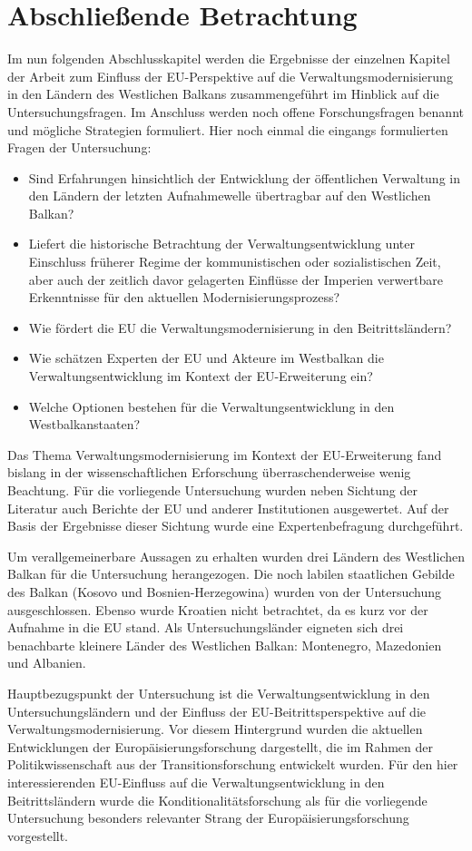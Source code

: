 \chapter{Abschließende Betrachtung}
Im nun folgenden Abschlusskapitel werden die Ergebnisse der einzelnen Kapitel der Arbeit zum Einfluss der EU-Perspektive auf die Verwaltungsmodernisierung in den Ländern des Westlichen Balkans zusammengeführt im Hinblick auf die Untersuchungsfragen. Im Anschluss werden noch offene Forschungsfragen benannt und mögliche Strategien formuliert. Hier noch einmal die eingangs formulierten Fragen der Untersuchung:
\begin{itemize}
\item Sind Erfahrungen hinsichtlich der Entwicklung der öffentlichen Verwaltung in den Ländern der letzten Aufnahmewelle übertragbar auf den Westlichen Balkan?
\item Liefert die historische Betrachtung der Verwaltungsentwicklung unter Einschluss früherer Regime der kommunistischen oder sozialistischen Zeit, aber auch der zeitlich davor gelagerten Einflüsse der Imperien verwertbare Erkenntnisse für den aktuellen Modernisierungsprozess?
\item Wie fördert die EU die Verwaltungsmodernisierung in den Beitrittsländern?
\item Wie schätzen Experten der EU und Akteure im Westbalkan die Verwaltungsentwicklung im Kontext der EU-Erweiterung ein?
\item Welche Optionen bestehen für die Verwaltungsentwicklung in den Westbalkanstaaten?
\end{itemize}
Das Thema Verwaltungsmodernisierung im Kontext der EU-Erweiterung fand bislang in der wissenschaftlichen Erforschung überraschenderweise wenig Beachtung. Für die vorliegende Untersuchung wurden neben Sichtung der Literatur auch Berichte der EU und anderer Institutionen ausgewertet. Auf der Basis der Ergebnisse dieser Sichtung wurde eine Expertenbefragung durchgeführt.\par
Um verallgemeinerbare Aussagen zu erhalten wurden drei Ländern des Westlichen Balkan für die Untersuchung herangezogen. Die noch labilen staatlichen Gebilde des Balkan (Kosovo und Bosnien-Herzegowina) wurden von der Untersuchung ausgeschlossen. Ebenso wurde Kroatien nicht betrachtet, da es kurz vor der Aufnahme in die EU stand. Als Untersuchungsländer eigneten sich drei benachbarte kleinere Länder des Westlichen Balkan: Montenegro, Mazedonien und Albanien.\par
Hauptbezugspunkt der Untersuchung ist die Verwaltungsentwicklung in den Untersuchungsländern und der Einfluss der EU-Beitrittsperspektive auf die Verwaltungsmodernisierung. Vor diesem Hintergrund wurden die aktuellen Entwicklungen der Europäisierungsforschung dargestellt, die im Rahmen der Politikwissenschaft aus der Transitionsforschung entwickelt wurden. Für den hier interessierenden EU-Einfluss auf die Verwaltungsentwicklung in den Beitrittsländern wurde die Konditionalitätsforschung als für die vorliegende Untersuchung besonders relevanter Strang der Europäisierungsforschung vorgestellt.\par

